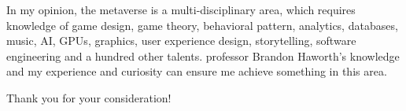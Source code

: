 \documentclass{article}
\begin{document}
In my opinion, the metaverse is a multi-disciplinary area, which requires knowledge of game design, game theory, behavioral pattern, analytics, databases, music, AI, GPUs, graphics, user experience design, storytelling, software engineering and a hundred other talents. professor Brandon Haworth's knowledge and my experience and curiosity can ensure me achieve something in this area.

Thank you for your consideration!
\end{document}
